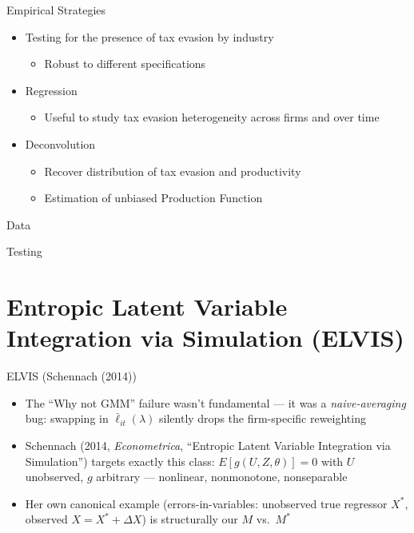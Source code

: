 \documentclass[
  ignorenonframetext,
  aspectratio=169,
]{beamer}
\providecommand{\tightlist}{%
  \setlength{\itemsep}{0pt}\setlength{\parskip}{0pt}}
\begin{document}
\begin{frame}{Empirical Strategies}
\protect{}\label{empirical-strategies}
\begin{itemize}
\tightlist
\item
  Testing for the presence of tax evasion by industry

  \begin{itemize}
  \tightlist
  \item
    Robust to different specifications
  \end{itemize}
\item
  Regression

  \begin{itemize}
  \tightlist
  \item
    Useful to study tax evasion heterogeneity across firms and over time
  \end{itemize}
\item
  Deconvolution

  \begin{itemize}
  \tightlist
  \item
    Recover distribution of tax evasion and productivity
  \item
    Estimation of unbiased Production Function
  \end{itemize}
\end{itemize}
\end{frame}

\begin{frame}{Data}
\protect{}\label{data}
\end{frame}

\begin{frame}{Testing}
\protect{}\label{testing}
\end{frame}

\section{Entropic Latent Variable Integration via Simulation
(ELVIS)}\label{entropic-latent-variable-integration-via-simulation-elvis}

\begin{frame}{ELVIS (Schennach (2014))}
\protect{}\label{sec-elvis}
\begin{itemize}
\tightlist
\item
  The ``Why not GMM'' failure wasn't fundamental --- it was a
  \emph{naive-averaging} bug: swapping in \(\bar\ell_{it}(\lambda)\)
  silently drops the firm-specific reweighting
\item
  Schennach (2014, \emph{Econometrica}, ``Entropic Latent Variable
  Integration via Simulation'') targets exactly this class:
  \(E[g(U,Z,\theta)]=0\) with \(U\) unobserved, \(g\) arbitrary ---
  nonlinear, nonmonotone, nonseparable
\item
  Her own canonical example (errors-in-variables: unobserved true
  regressor \(X^*\), observed \(X=X^*+\Delta X\)) is structurally our
  \(M\) vs.~\(M^*\)
\end{itemize}
\end{frame}
\end{document}
